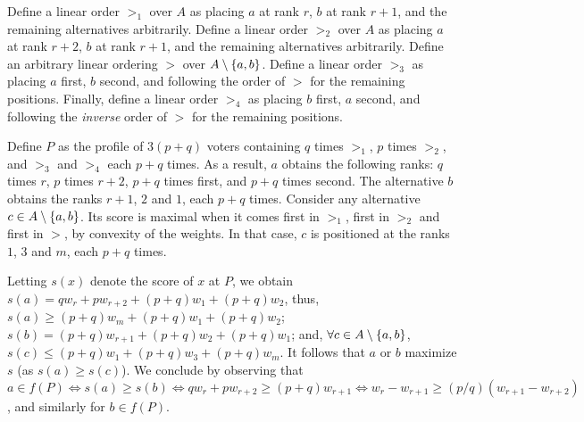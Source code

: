 \documentclass{article}
\begin{document}
\begin{proof*}
	\label{proof:chairQuestions}
	Define a linear order $>_1$ over $A$ as placing $a$ at rank $r$, $b$ at rank $r + 1$, and the remaining alternatives arbitrarily. 
	Define a linear order $>_2$ over $A$ as placing $a$ at rank $r + 2$, $b$ at rank $r + 1$, and the remaining alternatives arbitrarily.
	Define an arbitrary linear ordering $>$ over $A \setminus \{a, b\}$. 
	Define a linear order $>_3$ as placing $a$ first, $b$ second, and following the order of $>$ for the remaining positions.
	Finally, define a linear order $>_4$ as placing $b$ first, $a$ second, and following the \emph{inverse} order of $>$ for the remaining positions.
	
	Define $P$ as the profile of $3 (p + q)$ voters containing $q$ times $>_1$, $p$ times $>_2$, and $>_3$ and $>_4$ each $p + q$ times.
	As a result, $a$ obtains the following ranks: $q$ times $r$, $p$ times $r + 2$, $p + q$ times first, and $p + q$ times second. The alternative $b$ obtains the ranks $r + 1$, $2$ and $1$, each $p + q$ times. Consider any alternative $c \in A \setminus \{a, b\}$. Its score is maximal when it comes first in $>_1$, first in $>_2$ and first in $>$, by convexity of the weights. In that case, $c$ is positioned at the ranks $1$, $3$ and $m$, each $p + q$ times. 
	
	Letting $s(x)$ denote the score of $x$ at $P$, we obtain $s(a) = q w_r + p w_{r + 2} + (p + q) w_1 + (p + q) w_2$, thus, $s(a) ≥ (p + q) w_m + (p + q) w_1 + (p + q) w_2$; $s(b) = (p + q) w_{r + 1} + (p + q) w_2 + (p + q) w_1$; and, $\forall c \in A \setminus \{a, b\}$, 
	$s(c) ≤ (p + q) w_1 + (p + q) w_3 + (p + q) w_m$. It follows that $a$ or $b$ maximize $s$ (as $s(a) ≥ s(c)$). We conclude by observing that $a \in f(P) ⇔ s(a) ≥ s(b) ⇔ q w_r + p w_{r + 2} ≥ (p + q) w_{r + 1} ⇔ w_r - w_{r + 1} ≥ (p / q) (w_{r + 1} - w_{r + 2})$, and similarly for $b \in f(P)$.
\end{proof*}
\end{document}
